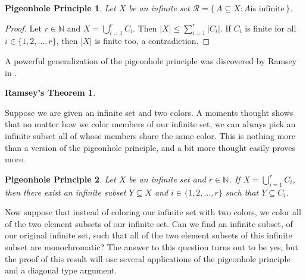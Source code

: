 \documentclass[12pt]{article}
\theoremstyle{plain}
\newtheorem*{php}{Pigeonhole Principle}
\newtheorem*{ramsey}{Ramsey's Theorem}
\theoremstyle{definition}
\newcommand{\bbN}{\mathbb{N}}
\newcommand{\calR}{\mathcal{R}}
\begin{document}
\begin{php}
  Let $X$ be an infinite set $\calR = \{\, A \subseteq X : \mbox{$A$
    is infinite} \,\}$.
\end{php}
\begin{proof}
  Let $r \in \bbN$ and $X = \bigcup_{i=1}^r C_i$.
  Then $|X| \le \sum_{i=1}^r |C_i|$.
  If $C_i$ is finite for all $i \in \{1, 2, \ldots, r\}$,
  then $|X|$ is finite too, a contradiction.
\end{proof}

A powerful generalization of the pigeonhole principle was discovered
by Ramsey in \cite{Ramsey:1930uq}. 

\begin{ramsey}
  
\end{ramsey}

Suppose we are given an infinite set and two colors.
A moments thought shows that no matter how we color members of our
infinite set, we can always pick an infinite subset all of whose
members share the same color.
This is nothing more than a version of the pigeonhole principle, and a
bit more thought easily proves more.

\begin{php}
  Let $X$ be an infinite set and $r \in \bbN$.
  If $X = \bigcup_{i=1}^r C_i$, then there exist an infinite subset $Y
  \subseteq X$ and $i \in \{1, 2, \ldots, r\}$ such that $Y \subseteq
  C_i$.
\end{php}

Now suppose that instead of coloring our infinite set with two colors,
we color all of the two element subsets of our infinite set. 
Can we find an infinite subset, of our original infinite set, such
that all of the two element subsets of this infinite subset are
monochromatic?
The answer to this question turns out to be yes, but the proof of this
result will use several applications of the pigeonhole principle and a
diagonal type argument.
\end{document}
